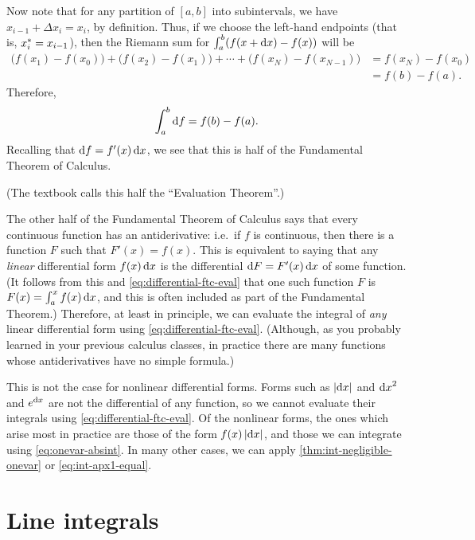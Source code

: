 \documentclass[12pt]{amsart}
\begin{document}
Now note that for any partition of $[a,b]$ into subintervals, we have $x_{i-1} + \Delta x_i = x_i$, by definition.
Thus, if we choose the left-hand endpoints (that is, ${x}_{i}^* = x_{i-1}$), then the Riemann sum for $\int_a^b (f(x+{\mathrm{d} x}) - f(x))$ will be
\begin{align*}
  \Big(f(x_1) - f(x_0)\Big) + \Big(f(x_2)-f(x_1)\Big) + \cdots + \Big(f(x_N) - f(x_{N-1})\Big)
  &= f(x_N) - f(x_0)\\
  &= f(b) - f(a).
\end{align*}
Therefore,
\begin{equation}
  \int_a^b {\mathrm{d} f} = f(b) - f(a).\label{eq:differential-ftc-eval}
\end{equation}
Recalling that ${\mathrm{d} f} = f'(x)\,{\mathrm{d} x}$, we see that this is half of the Fundamental Theorem of Calculus.
\begin{stewart}(The textbook calls this half the ``Evaluation Theorem''.)\end{stewart}

The other half of the Fundamental Theorem of Calculus says that every continuous function has an antiderivative: i.e.\ if $f$ is continuous, then there is a function $F$ such that $F'(x) = f(x)$.
This is equivalent to saying that any \emph{linear} differential form $f(x)\,{\mathrm{d} x}$ is the differential $\mathrm{d} F = F'(x)\,{\mathrm{d} x}$ of some function.
(It follows from this and \cref{eq:differential-ftc-eval} that one such function $F$ is $F(x)= \int_a^x f(x)\,{\mathrm{d} x}$, and this is often included as part of the Fundamental Theorem.)
Therefore, at least in principle, we can evaluate the integral of \emph{any} linear differential form using \cref{eq:differential-ftc-eval}.
(Although, as you probably learned in your previous calculus classes, in practice there are many functions whose antiderivatives have no simple formula.)

This is not the case for nonlinear differential forms.
Forms such as $|{\mathrm{d} x}|$ and ${\mathrm{d} x}^2$ and $e^{\mathrm{d} x}$ are not the differential of any function, so we cannot evaluate their integrals using \cref{eq:differential-ftc-eval}.
Of the nonlinear forms, the ones which arise most in practice are those of the form $f(x)\,|{\mathrm{d} x}|$, and those we can integrate using \cref{eq:onevar-absint}.
In many other cases, we can apply \cref{thm:int-negligible-onevar} or \cref{eq:int-apx1-equal}.


\section{Line integrals}
\label{sec:line-integrals}
\end{document}
